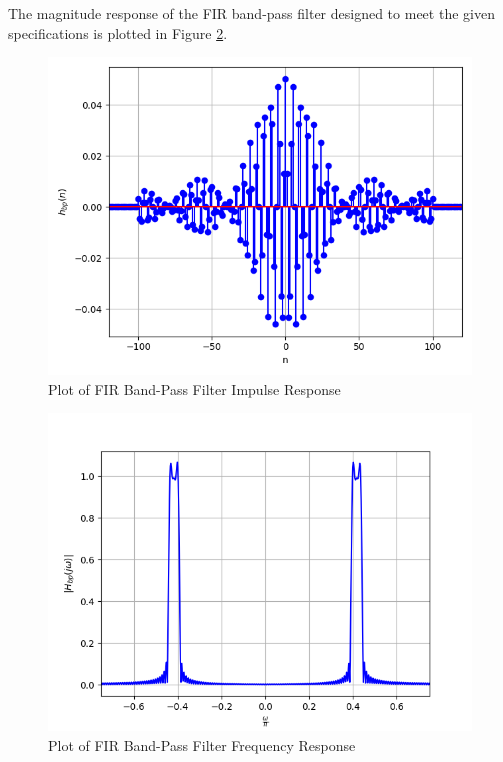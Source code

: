 \documentclass{article}
\begin{document}
The magnitude response of the FIR band-pass filter designed to meet the given specifications is plotted in Figure \ref{fig:9}.
\begin{figure}[!h]
    \centering
    \includegraphics[width = 0.95\columnwidth]{figs/fir_hbp.png}
    \caption{Plot of FIR Band-Pass Filter Impulse Response}
    \label{fig:8}
\end{figure}
\begin{figure}[!h]
    \centering
    \includegraphics[width = 0.95\columnwidth]{figs/firHbp.png}
    \caption{Plot of FIR Band-Pass Filter Frequency Response}
    \label{fig:9}
\end{figure}
\end{document}
